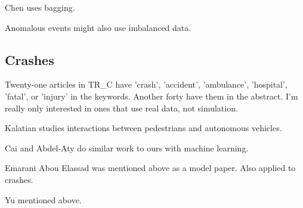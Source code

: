 Chen \cite{CHEN2022103709} uses bagging.

Anomalous events might also use imbalanced data.  

\subsection{Crashes}

Twenty-one articles in TR\_C have 'crash', 'accident', 'ambulance', 'hospital', 'fatal', or 'injury' in the keywords.  Another forty have them in the abstract.  I'm really only interested in ones that use real data, not simulation.  

Kalatian \cite{KALATIAN2021102962} studies interactions between pedestrians and autonomous vehicles.  

Cai and Abdel-Aty \cite{CAI2020102697} do similar work to ours with machine learning.

Emarani Abou Elassad \cite{ELAMRANIABOUELASSAD2020102708} was mentioned above as a model paper.  Also applied to crashes.  

Yu \cite{YU2020102740} mentioned above.  








